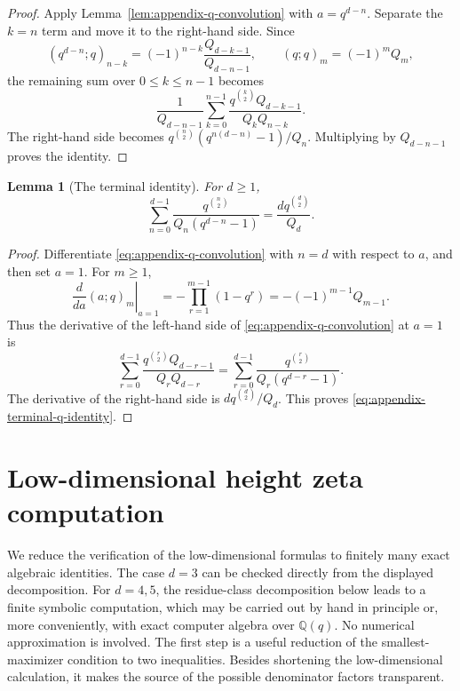 \documentclass[11pt]{amsart}
\theoremstyle{plain}
\newtheorem{lemma}[theorem]{Lemma}
\theoremstyle{definition}
\numberwithin{equation}{section}
\begin{document}
\begin{appendix}
\begin{proof}
Apply Lemma~\ref{lem:appendix-q-convolution} with $a=q^{d-n}$.  Separate the $k=n$ term and
move it to the right-hand side.  Since
\[
  (q^{d-n};q)_{n-k}=(-1)^{n-k}\frac{Q_{d-k-1}}{Q_{d-n-1}},\qquad
  (q;q)_m=(-1)^mQ_m,
\]
the remaining sum over $0\le k\le n-1$ becomes
\[
  \frac1{Q_{d-n-1}}
  \sum_{k=0}^{n-1}\frac{q^{\binom k2}Q_{d-k-1}}{Q_kQ_{n-k}}.
\]
The right-hand side becomes
$q^{\binom n2}(q^{n(d-n)}-1)/Q_n$.  Multiplying by $Q_{d-n-1}$ proves the identity.
\end{proof}

\begin{lemma}[The terminal identity]\label{lem:appendix-terminal-q-identity}
For $d\ge1$,
\begin{equation}\label{eq:appendix-terminal-q-identity}
  \sum_{n=0}^{d-1}\frac{q^{\binom n2}}{Q_n(q^{d-n}-1)}
  =\frac{dq^{\binom d2}}{Q_d}.
\end{equation}
\end{lemma}

\begin{proof}
Differentiate \eqref{eq:appendix-q-convolution} with $n=d$ with respect to $a$, and then
set $a=1$.  For $m\ge1$,
\[
  \left.\frac{d}{da}(a;q)_m
\right|_{a=1}
  =-\prod_{r=1}^{m-1}(1-q^r)=-(-1)^{m-1}Q_{m-1}.
\]
Thus the derivative of the left-hand side of \eqref{eq:appendix-q-convolution} at $a=1$ is
\[
  \sum_{r=0}^{d-1}\frac{q^{\binom r2}Q_{d-r-1}}{Q_rQ_{d-r}}
  =\sum_{r=0}^{d-1}\frac{q^{\binom r2}}{Q_r(q^{d-r}-1)}.
\]
The derivative of the right-hand side is
$dq^{\binom d2}/Q_d$.  This proves \eqref{eq:appendix-terminal-q-identity}.
\end{proof}

\begingroup

\section{Low-dimensional height zeta computation}\label{app:low-rank-computation}
\par\medskip

We reduce the verification of the low-dimensional formulas to finitely many exact
algebraic identities.  The case \(d=3\) can be checked directly from the displayed
decomposition.  For \(d=4,5\), the residue-class decomposition below leads to a finite
symbolic computation, which may be carried out by hand in principle or, more conveniently,
with exact computer algebra over \(\mathbb Q(q)\).  No numerical approximation is involved.
The first step is a useful reduction of the smallest-maximizer condition to two inequalities.
Besides shortening the low-dimensional calculation, it makes the source of the possible
denominator factors transparent.


\end{appendix}
\end{document}
